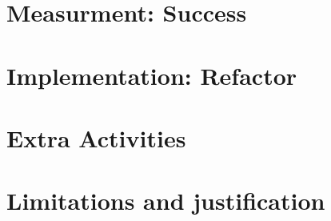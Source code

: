 \section{Measurment: Success}

\section{Implementation: Refactor}

\section{Extra Activities}

\section{Limitations and justification}
